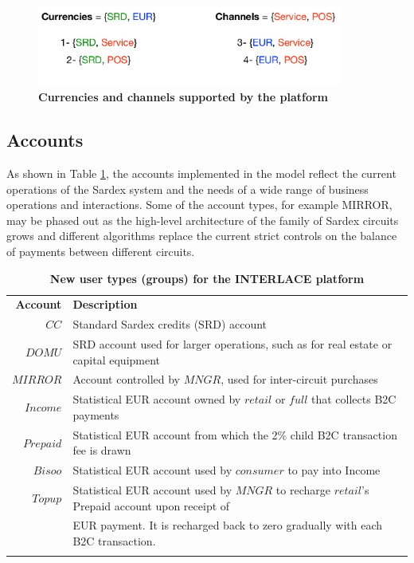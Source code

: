 \vspace{-0.3cm}
\begin{figure}[h]
\centering
\includegraphics[width=10cm]{Figures/Curr_Chan}
\caption{\small\textbf{Currencies and channels supported by the platform}}
\label{fig:currchan}
\end{figure}

\subsection{Accounts}
As shown in Table \ref{tab:accounts}, the accounts implemented in the model reflect the current operations of the Sardex system and the needs of a wide range of business operations and interactions. Some of the account types, for example MIRROR, may be phased out as the high-level architecture of the family of Sardex circuits grows and different algorithms replace the current strict controls on the balance of payments between different circuits.

\setlength{\tabcolsep}{10pt}
\begin{table}[htbp]
\begin{centering}
\small
{
\begin{tabular}{ r | l  }
\hline
\textbf{Account}	& \textbf{Description} \\
\Xhline{1.5pt}
$CC$ & Standard Sardex credits (SRD) account \\
\hline
$DOMU$ & SRD account used for larger operations, such as for real estate or capital equipment\\
\hline
$MIRROR$ & Account controlled by $MNGR$, used for inter-circuit purchases \\
\hline
$Income$ & Statistical EUR account owned by $retail$ or $full$ that collects B2C payments\\
\hline
$Prepaid$ & Statistical EUR account from which the 2\% child B2C transaction fee is drawn \\
\hline
$Bisoo$ & Statistical EUR account used by $consumer$ to pay into Income \\
\hline
$Topup$ & Statistical EUR account used by $MNGR$ to recharge $retail$'s Prepaid account upon receipt of \\
&\hspace{0.5cm} EUR payment. It is recharged back to zero gradually with each B2C transaction. \\
\Xhline{1.5pt}
\end{tabular}
}
\caption{\small\textbf{New user types (groups) for the INTERLACE platform}}
\label{tab:accounts}
\vspace{-0.5cm}
\end{centering}
\end{table}

